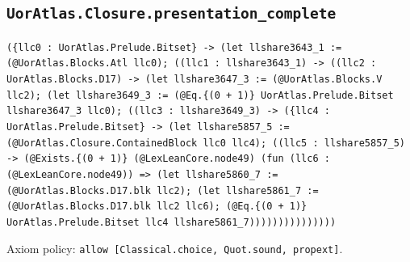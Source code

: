 \documentclass[11pt]{article}
\begin{document}
\subsection*{\texttt{UorAtlas.Closure.presentation\_complete}}
\noindent\texttt{(\{llc0 : UorAtlas.Prelude.Bitset\} -> (let llshare3643\_1 := (@UorAtlas.Blocks.Atl llc0); ((llc1 : llshare3643\_1) -> ((llc2 : UorAtlas.Blocks.D17) -> (let llshare3647\_3 := (@UorAtlas.Blocks.V llc2); (let llshare3649\_3 := (@Eq.\{(0 + 1)\} UorAtlas.Prelude.Bitset llshare3647\_3 llc0); ((llc3 : llshare3649\_3) -> (\{llc4 : UorAtlas.Prelude.Bitset\} -> (let llshare5857\_5 := (@UorAtlas.Closure.ContainedBlock llc0 llc4); ((llc5 : llshare5857\_5) -> (@Exists.\{(0 + 1)\} (@LexLeanCore.node49) (fun (llc6 : (@LexLeanCore.node49)) => (let llshare5860\_7 := (@UorAtlas.Blocks.D17.blk llc2); (let llshare5861\_7 := (@UorAtlas.Blocks.D17.blk llc2 llc6); (@Eq.\{(0 + 1)\} UorAtlas.Prelude.Bitset llc4 llshare5861\_7)))))))))))))))}\par
\noindent Axiom policy: \texttt{allow [Classical.choice, Quot.sound, propext]}.\par
\end{document}
